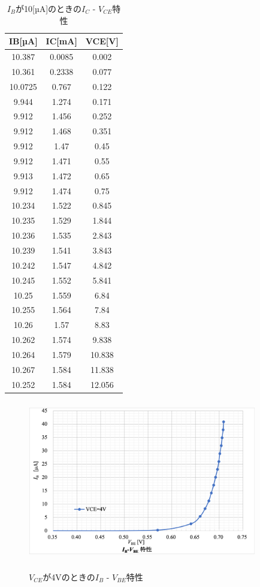 \documentclass[a4j,10pt,dvipdfmx]{jarticle}
\begin{document}
  \begin{table}[H]
  \label{4}
  \begin{center}
  \caption{$I_B$が10[µA]のときの$I_C$ - $V_{CE}$特性}
  \begin{tabular}{ccc} \\
  \hline
  IB[µA] & IC[mA] & VCE[V] \\ \hline
  10.387 & 0.0085 & 0.002 \\
  10.361 & 0.2338 & 0.077 \\
  10.0725 & 0.767 & 0.122 \\
  9.944 & 1.274 & 0.171 \\
  9.912 & 1.456 & 0.252 \\
  9.912 & 1.468 & 0.351 \\
  9.912 & 1.47 & 0.45 \\
  9.912 & 1.471 & 0.55 \\
  9.913 & 1.472 & 0.65 \\
  9.912 & 1.474 & 0.75 \\
  10.234 & 1.522 & 0.845 \\
  10.235 & 1.529 & 1.844 \\
  10.236 & 1.535 & 2.843 \\
  10.239 & 1.541 & 3.843 \\
  10.242 & 1.547 & 4.842 \\
  10.245 & 1.552 & 5.841 \\
  10.25 & 1.559 & 6.84 \\
  10.255 & 1.564 & 7.84 \\
  10.26 & 1.57 & 8.83 \\
  10.262 & 1.574 & 9.838 \\
  10.264 & 1.579 & 10.838 \\
  10.267 & 1.584 & 11.838 \\
  10.252 & 1.584 & 12.056 \\ \hline
  \end{tabular}
  \end{center}
  \end{table}
  \begin{figure}[H]
    \begin{center}
      \label{b-vbe}
    \includegraphics[height=7cm,width=10cm]{4vibvbe.png}
    \caption{$V_{CE}$が4Vのときの$I_B$ - $V_{BE}$特性}
  \end{center}
  \end{figure}
\end{document}

